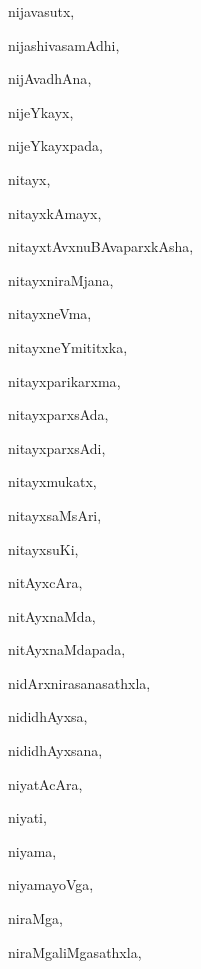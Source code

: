 \begin{multicols}{3}
{\noindent
{nijavasutx}, \pageref{nijavasutx}

\noindent
{nijashivasamAdhi}, \pageref{nijashivasamAdhi}

\noindent
{nijAvadhAna}, \pageref{nijAvadhAna}

\noindent
{nijeYkayx}, \pageref{nijeYkayx}

\noindent
{nijeYkayxpada}, \pageref{nijeYkayxpada}

\noindent
{nitayx}, \pageref{nitayx}

\noindent
{nitayxkAmayx}, \pageref{nitayxkAmayx}

\noindent
{nitayxtAvxnuBAvaparxkAsha}, \pageref{nitayxtAvxnuBAvaparxkAsha}

\noindent
{nitayxniraMjana}, \pageref{nitayxniraMjana}

\noindent
{nitayxneVma}, \pageref{nitayxneVma}

\noindent
{nitayxneYmititxka}, \pageref{nitayxneYmititxka}

\noindent
{nitayxparikarxma}, \pageref{nitayxparikarxma}

\noindent
{nitayxparxsAda}, \pageref{nitayxparxsAda}

\noindent
{nitayxparxsAdi}, \pageref{nitayxparxsAdi}

\noindent
{nitayxmukatx}, \pageref{nitayxmukatx}

\noindent
{nitayxsaMsAri}, \pageref{nitayxsaMsAri}

\noindent
{nitayxsuKi}, \pageref{nitayxsuKi}

\noindent
{nitAyxcAra}, \pageref{nitAyxcAra}

\noindent
{nitAyxnaMda}, \pageref{nitAyxnaMda}

\noindent
{nitAyxnaMdapada}, \pageref{nitAyxnaMdapada}

\noindent
{nidArxnirasanasathxla}, \pageref{nidArxnirasanasathxla}

\noindent
{nididhAyxsa}, \pageref{nididhAyxsa}

\noindent
{nididhAyxsana}, \pageref{nididhAyxsana}

\noindent
{niyatAcAra}, \pageref{niyatAcAra}

\noindent
{niyati}, \pageref{niyati}

\noindent
{niyama}, \pageref{niyama}

\noindent
{niyamayoVga}, \pageref{niyamayoVga}

\noindent
{niraMga}, \pageref{niraMga}

\noindent
{niraMgaliMgasathxla}, \pageref{niraMgaliMgasathxla}

}
\end{multicols}
